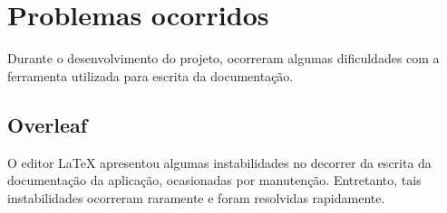 \section{Problemas ocorridos}
Durante o desenvolvimento do projeto, ocorreram algumas dificuldades com a ferramenta utilizada para escrita da documentação.

\subsection{Overleaf}
O editor LaTeX apresentou algumas instabilidades no decorrer da escrita da documentação da aplicação, ocasionadas por manutenção. Entretanto, tais instabilidades ocorreram raramente e foram resolvidas rapidamente.